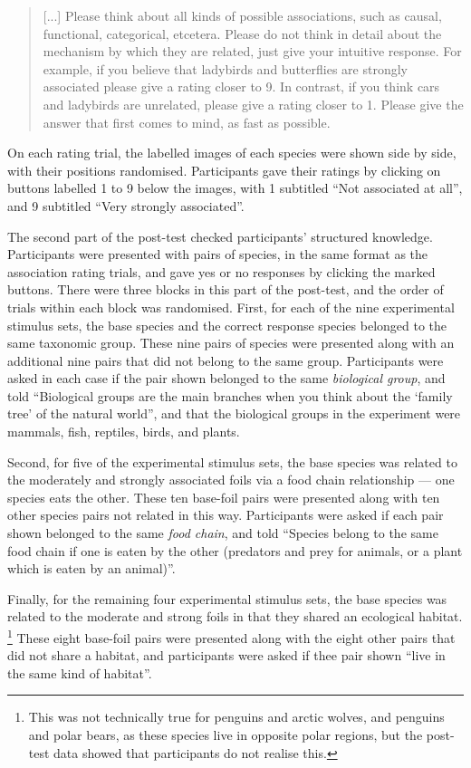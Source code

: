\begin{quote}
  [...] Please think about all kinds of possible associations, such as causal,
  functional, categorical, etcetera. Please do not think in detail about
  the mechanism by which they are related, just give your intuitive
  response. For example, if you believe that ladybirds and butterflies
  are strongly associated please give a rating closer to 9. In contrast,
  if you think cars and ladybirds are unrelated, please give a rating
  closer to 1. Please give the answer that first comes to mind, as fast
  as possible.  
\end{quote}

On each rating trial, the labelled images of each species
were shown side by side, with their positions randomised.
Participants gave their ratings by clicking on buttons
labelled 1 to 9 below the images,
with 1 subtitled ``Not associated at all'',
and 9 subtitled ``Very strongly associated''.

The second part of the post-test checked participants' structured knowledge.
Participants were presented with pairs of species,
in the same format as the association rating trials,
and gave yes or no responses by clicking the marked buttons.
There were three blocks in this part of the post-test,
and the order of trials within each block was randomised.
First, for each of the nine experimental stimulus sets,
the base species and the correct response species
belonged to the same taxonomic group.
These nine pairs of species were presented along with
an additional nine pairs that did not belong to the same group.
Participants were asked in each case if the pair shown
belonged to the same \emph{biological group}, and told
``Biological groups are the main branches
when you think about the `family tree' of the natural world'',
and that the biological groups in the experiment were
mammals, fish, reptiles, birds, and plants.

Second, for five of the experimental stimulus sets,
the base species was related to the moderately and strongly associated foils
via a food chain relationship --- one species eats the other.
These ten base-foil pairs were presented along with
ten other species pairs not related in this way.
Participants were asked if each pair shown belonged to the same \emph{food chain},
and told ``Species belong to the same food chain if one is eaten by the other
(predators and prey for animals, or a plant which is eaten by an animal)''.

Finally, for the remaining four experimental stimulus sets,
the base species was related to the moderate and strong foils
in that they shared an ecological habitat.%
\footnote{
  This was not technically true for penguins and arctic wolves,
  and penguins and polar bears, as these species live in
  opposite polar regions, but the post-test data showed that
  participants do not realise this.
}
These eight base-foil pairs were presented along with
the eight other pairs that did not share a habitat,
and participants were asked if thee pair shown ``live in the same kind of habitat''.


